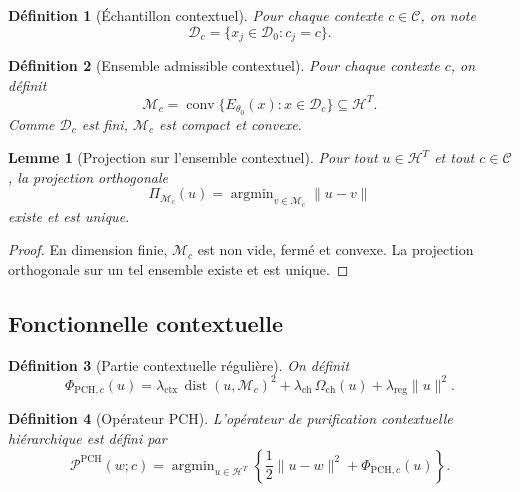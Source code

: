 \documentclass[11pt,a4paper]{article}
\newtheorem{definition}{Définition}[section]
\newtheorem{remark}{Remarque}[section]
\newtheorem{lemma}{Lemme}[section]
\DeclareMathOperator{\argmin}{argmin}
\DeclareMathOperator{\dist}{dist}
\DeclareMathOperator{\conv}{conv}
\newcommand{\C}{\mathcal C}
\newcommand{\D}{\mathcal D}
\newcommand{\Hh}{\mathcal H}
\newcommand{\Pcal}{\mathcal P}
\newcommand{\Mcal}{\mathcal M}
\newcommand{\1}{\mathbf 1}
\begin{document}
\begin{definition}[Échantillon contextuel]
Pour chaque contexte \(c\in\C\), on note
\[
\D_c=\{x_j\in\D_0 : c_j=c\}.
\]
\end{definition}

\begin{definition}[Ensemble admissible contextuel]
Pour chaque contexte \(c\), on définit
\[
\Mcal_c
=
\conv\{E_{\theta_0}(x): x\in\D_c\}\subseteq \Hh^T.
\]
Comme \(\D_c\) est fini, \(\Mcal_c\) est compact et convexe.
\end{definition}

\begin{lemma}[Projection sur l'ensemble contextuel]
Pour tout \(u\in\Hh^T\) et tout \(c\in\C\), la projection orthogonale
\[
\Pi_{\Mcal_c}(u)=\argmin_{v\in\Mcal_c}\|u-v\|
\]
existe et est unique.
\end{lemma}

\begin{proof}
En dimension finie, \(\Mcal_c\) est non vide, fermé et convexe.  
La projection orthogonale sur un tel ensemble existe et est unique.
\end{proof}

\subsection{Fonctionnelle contextuelle}

\begin{definition}[Partie contextuelle régulière]
On définit
\[
\Phi_{\mathrm{PCH},c}(u)
=
\lambda_{\mathrm{ctx}}\,\dist(u,\Mcal_c)^2
+
\lambda_{\mathrm{ch}}\,\Omega_{\mathrm{ch}}(u)
+
\lambda_{\mathrm{reg}}\|u\|^2.
\]
\end{definition}

\begin{definition}[Opérateur PCH]
L'opérateur de purification contextuelle hiérarchique est défini par
\[
\Pcal^{\mathrm{PCH}}(w;c)
=
\argmin_{u\in\Hh^T}
\left\{
\frac12\|u-w\|^2+\Phi_{\mathrm{PCH},c}(u)
\right\}.
\]
\end{definition}
\end{document}
